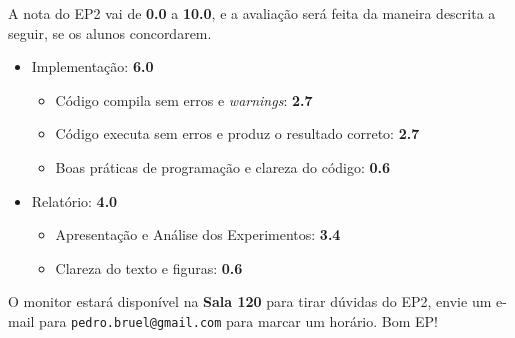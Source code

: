 \documentclass[final,12pt,a4paper]{elsarticle}
\begin{document}
A nota do EP2 vai de \textbf{0.0} a \textbf{10.0}, e a avaliação será feita da
maneira descrita a seguir, se os alunos concordarem.

\begin{itemize}
    \item Implementação: \textbf{6.0}
    \begin{itemize}
        \item Código compila sem erros e \textit{warnings}: \textbf{2.7}
        \item Código executa sem erros e produz o resultado correto: \textbf{2.7}
        \item Boas práticas de programação e clareza do código: \textbf{0.6}
    \end{itemize}
    \item Relatório: \textbf{4.0}
    \begin{itemize}
        \item Apresentação e Análise dos Experimentos: \textbf{3.4}
        \item Clareza do texto e figuras: \textbf{0.6}
    \end{itemize}
\end{itemize}

O monitor estará disponível na \textbf{Sala 120} para tirar dúvidas do EP2,
envie um e-mail para \texttt{pedro.bruel@gmail.com} para marcar um horário.
Bom EP!









\end{document}
